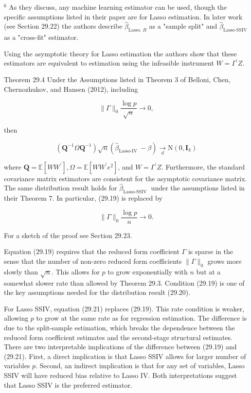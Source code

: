 \documentclass[10pt]{article}
\begin{document}
${ }^{6}$ As they discuss, any machine learning estimator can be used, though the specific assumptions listed in their paper are for Lasso estimation. In later work (see Section 29.22) the authors describe $\widehat{\beta}_{\text {Lasso, } B}$ as a "sample split" and $\widehat{\beta}_{\text {Lasso-SSIV }}$ as a "cross-fit" estimator.

Using the asymptotic theory for Lasso estimation the authors show that these estimators are equivalent to estimation using the infeasible instrument $W=\Gamma^{\prime} Z$.

Theorem 29.4 Under the Assumptions listed in Theorem 3 of Belloni, Chen, Chernozhukov, and Hansen (2012), including

$$
\|\Gamma\|_{0} \frac{\log p}{\sqrt{n}} \rightarrow 0,
$$

then

$$
\left(\boldsymbol{Q}^{-1} \Omega \boldsymbol{Q}^{-1}\right) \sqrt{n}\left(\widehat{\beta}_{\text {Lasso-IV }}-\beta\right) \underset{d}{\rightarrow} \mathrm{N}\left(0, \boldsymbol{I}_{k}\right)
$$

where $\boldsymbol{Q}=\mathbb{E}\left[W W^{\prime}\right], \Omega=\mathbb{E}\left[W W^{\prime} e^{2}\right]$, and $W=\Gamma^{\prime} Z$. Furthermore, the standard covariance matrix estimators are consistent for the asymptotic covariance matrix. The same distribution result holds for $\widehat{\beta}_{\text {Lasso-SSIV }}$ under the assumptions listed in their Theorem 7. In particular, (29.19) is replaced by

$$
\|\Gamma\|_{0} \frac{\log p}{n} \rightarrow 0 .
$$

For a sketch of the proof see Section $29.23$.

Equation (29.19) requires that the reduced form coefficient $\Gamma$ is sparse in the sense that the number of non-zero reduced form coefficients $\|\Gamma\|_{0}$ grows more slowly than $\sqrt{n}$. This allows for $p$ to grow exponentially with $n$ but at a somewhat slower rate than allowed by Theorem 29.3. Condition (29.19) is one of the key assumptions needed for the distribution result (29.20).

For Lasso SSIV, equation (29.21) replaces (29.19). This rate condition is weaker, allowing $p$ to grow at the same rate as for regression estimation. The difference is due to the split-sample estimation, which breaks the dependence between the reduced form coefficient estimates and the second-stage structural estimates. There are two interpretable implications of the difference between (29.19) and (29.21). First, a direct implication is that Lasso SSIV allows for larger number of variables $p$. Second, an indirect implication is that for any set of variables, Lasso SSIV will have reduced bias relative to Lasso IV. Both interpretations suggest that Lasso SSIV is the preferred estimator.
\end{document}
